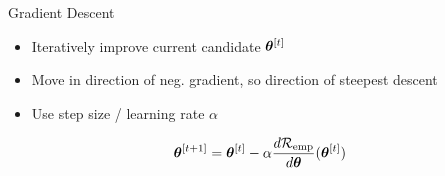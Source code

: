\documentclass[11pt,compress,t,notes=noshow, xcolor=table]{beamer}
\begin{document}





\begin{vbframe}{Gradient Descent}
  \begin{itemize}
    
    \item Iteratively improve  current candidate $\bm{\theta}^{[t]}$ 
    \item Move in direction of  neg. gradient, so direction of steepest descent
    \item Use step size / learning rate $\alpha$ 
    
  \end{itemize}
  
\[
  \bm{\theta}^{[t+1]} = \bm{\theta}^{[t]} - \alpha \frac{d \mathcal{R}_{\text{emp}}}{d\bm{\theta}}{(\bm{\theta}^{[t]})}
\]
  
  
  

  
\end{vbframe}
\end{document}
